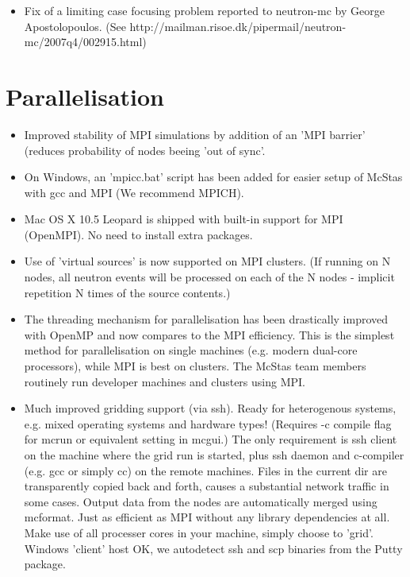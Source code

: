 \begin{itemize}
\item Fix of a limiting case focusing problem reported to neutron-mc by George Apostolopoulos.
      (See http://mailman.risoe.dk/pipermail/neutron-mc/2007q4/002915.html)
\end{itemize}

\section{Parallelisation}
\label{s:new-features:parallelisation}

\begin{itemize}
\item Improved stability of MPI simulations by addition of an 'MPI barrier' (reduces probability of nodes beeing 'out of sync'.
\item On Windows, an 'mpicc.bat' script has been added for easier setup of McStas with gcc and MPI (We recommend MPICH).
\item Mac OS X 10.5 Leopard is shipped with built-in support for MPI (OpenMPI). No need to install extra packages.
\item Use of 'virtual sources' is now supported on MPI clusters. (If running on N nodes, all neutron events will be processed
     on each of the N nodes - implicit repetition N times of the source contents.)
\item The threading mechanism for parallelisation has been drastically improved with OpenMP and now compares to the MPI efficiency. This is the simplest method for 
  parallelisation on single machines (e.g. modern dual-core processors), while MPI is best on clusters.
  The McStas team members routinely run developer machines and
  clusters using MPI.
\item Much improved gridding support (via ssh). Ready for heterogenous systems, e.g. mixed operating systems and hardware
     types! (Requires -c compile flag for mcrun or equivalent setting in mcgui.) The only requirement is ssh client on the machine 
     where the grid run is started, plus ssh daemon and c-compiler (e.g. gcc or simply cc) on the remote machines. Files in the 
     current dir are transparently copied back and forth, causes a substantial network traffic in some cases. Output data from the 
     nodes are automatically merged using mcformat. Just as efficient as MPI without any library dependencies at all. Make use 
     of all processer cores in your machine, simply choose to 'grid'. Windows 'client' host OK, we autodetect ssh and scp binaries
     from the Putty package.
\end{itemize}

